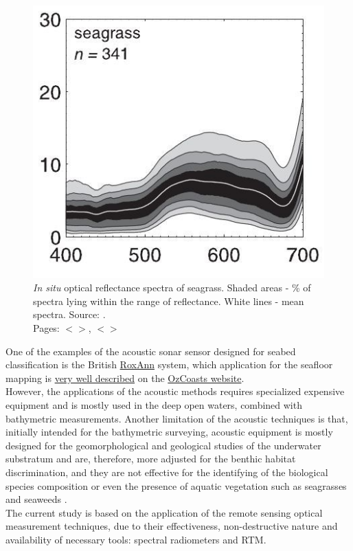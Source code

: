 \documentclass[11pt]{article}
\begin{document}
\begin{figure}[H]
	\centering
	\includegraphics[scale=0.35]{Fig-11.jpg}
	\caption{\textit{In situ} optical reflectance spectra of seagrass. Shaded areas - \% of spectra lying within the range of reflectance. 
		White lines - mean spectra. Source: \cite{Hochberg03b}\label{Hochberg03b}. \\ Pages: $<$\pageref{page-17}$>$, $<$\pageref{page-21}$>$}
	\label{fig:13}
\end{figure}

One of the examples of the acoustic sonar sensor designed for seabed classification is the British \href{http://sonavision.co.uk/products.asp?cat_id=1}{RoxAnn} system, which application for the seafloor mapping is \href{http://www.ozcoasts.org.au/geom_geol/toolkit/Tech_CA_asc.jsp}{very well described} on the \href{http://www.ozcoasts.org.au/}{OzCoasts website}.\\ However, the applications of the acoustic methods requires specialized expensive equipment and is mostly used in the deep open waters, combined with bathymetric measurements. Another limitation of the acoustic
techniques is that, initially intended for the bathymetric surveying, acoustic equipment is mostly designed for the geomorphological and geological studies of the underwater substratum and are, therefore, more adjusted for the benthic habitat discrimination, and they are not effective for the identifying of the biological species composition or even the presence of aquatic vegetation such as seagrasses and seaweeds \cite{Werdell03}\label{Werdell03}.\\
The current study is based on the application of the remote sensing optical measurement techniques, due to their effectiveness, non-destructive nature and availability of necessary tools: spectral radiometers and \ac{RTM}.
\end{document}

